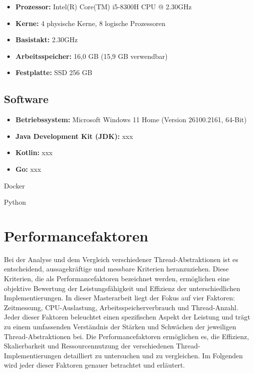 \documentclass[fontsize=12pt,paper=a4,twoside=semi,parskip=half-,headsepline,headinclude]{scrreprt}
\begin{document}
\begin{itemize}
	\item \textbf{Prozessor:} Intel(R) Core(TM) i5-8300H CPU @ 2.30GHz
	\item[] \hspace{0.8cm}\textbf{Kerne:} 4 physische Kerne, 8 logische Prozessoren
	\item[] \hspace{0.8cm}\textbf{Basistakt:} 2.30GHz
	\item \textbf{Arbeitsspeicher:} 16,0 GB (15,9 GB verwendbar)
	\item \textbf{Festplatte:} SSD 256 GB
\end{itemize}

\subsection{Software}

\begin{itemize}
	\item \textbf{Betriebssystem:} Microsoft Windows 11 Home (Version 26100.2161, 64-Bit)
	\item \textbf{Java Development Kit (JDK):} xxx
	\item \textbf{Kotlin:} xxx
	\item \textbf{Go:} xxx
\end{itemize}

Docker

Python


\section{Performancefaktoren}

Bei der Analyse und dem Vergleich verschiedener Thread-Abstraktionen ist es entscheidend, aussagekräftige und messbare Kriterien heranzuziehen. Diese Kriterien, die als Performancefaktoren bezeichnet werden, ermöglichen eine objektive Bewertung der Leistungsfähigkeit und Effizienz der unterschiedlichen Implementierungen. In dieser Masterarbeit liegt der Fokus auf vier Faktoren: Zeitmessung, CPU-Auslastung, Arbeitsspeicherverbrauch und Thread-Anzahl. Jeder dieser Faktoren beleuchtet einen spezifischen Aspekt der Leistung und trägt zu einem umfassenden Verständnis der Stärken und Schwächen der jeweiligen Thread-Abstraktionen bei. Die Performancefaktoren ermöglichen es, die Effizienz, Skalierbarkeit und Ressourcennutzung der verschiedenen Thread-\-Imple\-mentie\-rungen detailliert zu untersuchen und zu vergleichen. Im Folgenden wird jeder dieser Faktoren genauer betrachtet und erläutert.
\end{document}
